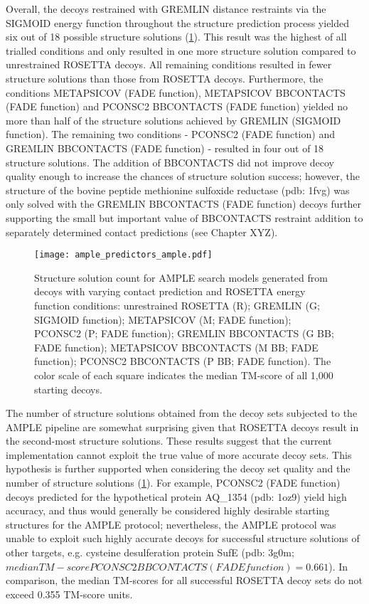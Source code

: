 Overall, the decoys restrained with GREMLIN distance restraints via the SIGMOID energy function throughout the structure prediction process yielded six out of 18 possible structure solutions (\cref{fig:ample_predictor_ample}). This result was the highest of all trialled conditions and only resulted in one more structure solution compared to unrestrained ROSETTA decoys. All remaining conditions resulted in fewer structure solutions than those from ROSETTA decoys. Furthermore, the conditions METAPSICOV (FADE function), METAPSICOV BBCONTACTS (FADE function) and PCONSC2 BBCONTACTS (FADE function) yielded no more than half of the structure solutions achieved by GREMLIN (SIGMOID function). The remaining two conditions - PCONSC2 (FADE function) and GREMLIN BBCONTACTS (FADE function) - resulted in four out of 18 structure solutions. The addition of BBCONTACTS did not improve decoy quality enough to increase the chances of structure solution success; however, the structure of the bovine peptide methionine sulfoxide reductase (\gls{pdb}: 1fvg) was only solved with the GREMLIN BBCONTACTS (FADE function) decoys further supporting the small but important value of BBCONTACTS restraint addition to separately determined contact predictions (see Chapter XYZ).

\begin{figure}[H]
    \centering
    \texttt{[image: ample\_predictors\_ample.pdf]}
    \caption{Structure solution count for AMPLE search models generated from decoys with varying contact prediction and ROSETTA energy function conditions: unrestrained ROSETTA (R); GREMLIN (G; SIGMOID function); METAPSICOV (M; FADE function); PCONSC2  (P; FADE function); GREMLIN BBCONTACTS (G BB; FADE function); METAPSICOV BBCONTACTS (M BB; FADE function); PCONSC2 BBCONTACTS (P BB; FADE function). The color scale of each square indicates the median TM-score of all 1,000 starting decoys.}
    \label{fig:ample_predictor_ample}
\end{figure}

The number of structure solutions obtained from the decoy sets subjected to the AMPLE pipeline are somewhat surprising given that ROSETTA decoys result in the second-most structure solutions. These results suggest that the current implementation cannot exploit the true value of more accurate decoy sets. This hypothesis is further supported when considering the decoy set quality and the number of structure solutions (\cref{fig:ample_predictor_ample}). For example, PCONSC2 (FADE function) decoys predicted for the hypothetical protein AQ\_1354 (\gls{pdb}: 1oz9) yield high accuracy, and thus would generally be considered highly desirable starting structures for the AMPLE protocol; nevertheless, the AMPLE protocol was unable to exploit such highly accurate decoys for successful structure solutions of other targets, e.g. cysteine desulferation protein SufE (\gls{pdb}: 3g0m; $median TM-score PCONSC2 BBCONTACTS (FADE function)=0.661$). In comparison, the median TM-scores for all successful ROSETTA decoy sets do not exceed 0.355 TM-score units.

